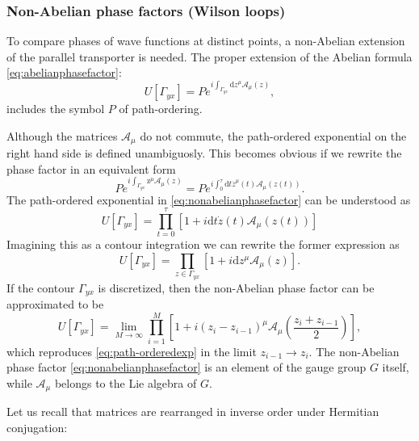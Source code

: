 \subsubsection{Non-Abelian phase factors (Wilson loops)}
  To compare phases of wave functions at distinct points, a non-Abelian
  extension of the parallel transporter is needed. The proper extension of the
  Abelian formula \eqref{eq:abelianphasefactor}:
\begin{equation}
  U\left[\Gamma_{yx}\right]
  = Pe^{i\int_{\Gamma_{yx}}\mathrm{d}z^\mu\mathcal{A}_\mu(z)},
  \label{eq:nonabelianphasefactor}
\end{equation}
includes the symbol $P$ of path-ordering.
\par Although the matrices $\mathcal{A}_\mu$ do not commute, the path-ordered
exponential on the right hand side is defined unambiguosly. This becomes obvious if
we rewrite the phase factor in an equivalent form
\begin{equation}
Pe^{i\int_{\Gamma_{yx}}\mathrm{z}^\mu\mathcal{A}_\mu(z)}
= Pe^{i\int_0^\tau\mathrm{d}t\dot{z}^\mu(t)\mathcal{A}_\mu(z(t))}.
\end{equation}
The path-ordered exponential in \eqref{eq:nonabelianphasefactor} can be
understood as
\begin{equation}
  U\left[\Gamma_{yx}\right]
  = \prod_{t=0}^{\tau}\left[1+i\mathrm{d}t\dot{z}(t)\mathcal{A}_\mu(z(t))\right]
\end{equation}
Imagining this as a contour integration we can rewrite the former expression as
\begin{equation}
  U\left[\Gamma_{yx}\right]
  = \prod_{z\in{\Gamma_{yx}}}\left[1+i\mathrm{d}z^\mu\mathcal{A_\mu}(z)\right].
  \label{eq:path-orderedexp}
\end{equation}
If the contour $\Gamma_{yx}$ is discretized, then the non-Abelian phase factor
can be approximated to be
\begin{equation}
  U\left[\Gamma_{yx}\right]
  = \lim_{M\rightarrow\infty}\prod_{i=1}^{M}\left[1+i(z_i-z_{i-1})^\mu\mathcal{A}_\mu\left(\frac{z_i+z_{i-1}}{2}\right)\right],
  \label{eq:discretizedphasefactoraprrox}
\end{equation}
which reproduces \eqref{eq:path-orderedexp} in the limit $z_{i-1}\rightarrow
z_i$.
The non-Abelian phase factor \eqref{eq:nonabelianphasefactor} is an element of
the gauge group $G$ itself, while $\mathcal{A}_\mu$ belongs to the Lie algebra
of $G$.
\par Let us recall that matrices are rearranged in inverse order under
Hermitian conjugation:
